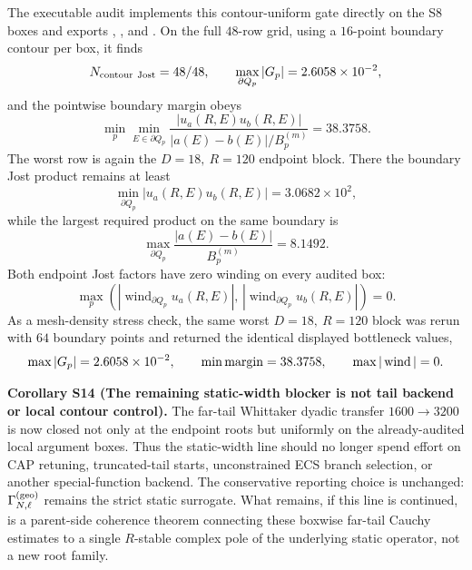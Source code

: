 \documentclass[aps,prd,onecolumn,notitlepage,nofootinbib,superscriptaddress,11pt,floatfix]{revtex4-2}
\begin{document}
The executable audit  implements this contour-uniform gate directly on the S8 boxes and exports , , and .  On the full \(48\)-row grid, using a \(16\)-point boundary contour per box, it finds
\[
N_{\rm contour\ Jost}=48/48,\qquad
\max_{\partial Q_p}|G_p|=2.6058\times10^{-2},
\]
and the pointwise boundary margin obeys
\[
\min_{p}\min_{E\in\partial Q_p}
\frac{|u_a(R,E)u_b(R,E)|}
{|a(E)-b(E)|/B_p^{(m)}}
=38.3758.
\]
The worst row is again the \(D=18,\ R=120\) endpoint block.  There the boundary Jost product remains at least
\[
\min_{\partial Q_p}|u_a(R,E)u_b(R,E)|
=3.0682\times10^2,
\]
while the largest required product on the same boundary is
\[
\max_{\partial Q_p}\frac{|a(E)-b(E)|}{B_p^{(m)}}
=8.1492.
\]
Both endpoint Jost factors have zero winding on every audited box:
\[
\max_p\left(
|\operatorname{wind}_{\partial Q_p}u_a(R,E)|,\,
|\operatorname{wind}_{\partial Q_p}u_b(R,E)|
\right)=0.
\]
As a mesh-density stress check, the same worst \(D=18,\ R=120\) block was rerun with \(64\) boundary points and returned the identical displayed bottleneck values,
\[
\max |G_p|=2.6058\times10^{-2},\qquad
\min {\rm margin}=38.3758,\qquad
\max |\operatorname{wind}|=0 .
\]

\medskip\noindent\textbf{Corollary S14 (The remaining static-width blocker is not tail backend or local contour control).}
The far-tail Whittaker dyadic transfer \(1600\to3200\) is now closed not only at the endpoint roots but uniformly on the already-audited local argument boxes.  Thus the static-width line should no longer spend effort on CAP retuning, truncated-tail starts, unconstrained ECS branch selection, or another special-function backend.  The conservative reporting choice is unchanged: \(\Gamma_{N,\ell}^{\rm(geo)}\) remains the strict static surrogate.  What remains, if this line is continued, is a parent-side coherence theorem connecting these boxwise far-tail Cauchy estimates to a single \(R\)-stable complex pole of the underlying static operator, not a new root family.
\end{document}
